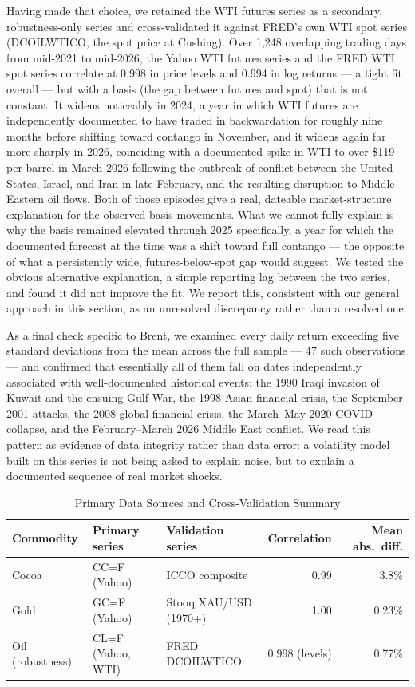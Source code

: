 \documentclass[preprint,12pt,authoryear]{elsarticle}
\begin{document}
Having made that choice, we retained the WTI futures series as a
secondary, robustness-only series and cross-validated it against
FRED's own WTI spot series (DCOILWTICO, the spot price at Cushing).
Over 1{,}248 overlapping trading days from mid-2021 to mid-2026, the
Yahoo WTI futures series and the FRED WTI spot series correlate at
0.998 in price levels and 0.994 in log returns — a tight fit overall
— but with a basis (the gap between futures and spot) that is not
constant. It widens noticeably in 2024, a year in which WTI futures
are independently documented to have traded in backwardation for
roughly nine months before shifting toward contango in November, and
it widens again far more sharply in 2026, coinciding with a documented
spike in WTI to over \$119 per barrel in March 2026 following the
outbreak of conflict between the United States, Israel, and Iran in
late February, and the resulting disruption to Middle Eastern oil
flows. Both of those episodes give a real, dateable market-structure
explanation for the observed basis movements. What we cannot fully
explain is why the basis remained elevated through 2025 specifically,
a year for which the documented forecast at the time was a shift
toward full contango — the opposite of what a persistently wide,
futures-below-spot gap would suggest. We tested the obvious
alternative explanation, a simple reporting lag between the two
series, and found it did not improve the fit. We report this,
consistent with our general approach in this section, as an
unresolved discrepancy rather than a resolved one.

As a final check specific to Brent, we examined every daily return
exceeding five standard deviations from the mean across the full
sample — 47 such observations — and confirmed that essentially all of
them fall on dates independently associated with well-documented
historical events: the 1990 Iraqi invasion of Kuwait and the ensuing
Gulf War, the 1998 Asian financial crisis, the September 2001 attacks,
the 2008 global financial crisis, the March–May 2020 COVID collapse,
and the February–March 2026 Middle East conflict. We read this
pattern as evidence of data integrity rather than data error: a
volatility model built on this series is not being asked to explain
noise, but to explain a documented sequence of real market shocks.

\begin{table}[htbp]
\centering
\caption{Primary Data Sources and Cross-Validation Summary}
\label{tab:sources}
\small
\begin{tabular}{lllrr}
\toprule
Commodity & Primary series & Validation series & Correlation & Mean abs.\ diff. \\
\midrule
Cocoa & CC=F (Yahoo) & ICCO composite & 0.99 & 3.8\% \\
Gold  & GC=F (Yahoo) & Stooq XAU/USD (1970+) & 1.00 & 0.23\% \\
Oil (robustness) & CL=F (Yahoo, WTI) & FRED DCOILWTICO & 0.998 (levels) & 0.77\% \\
\bottomrule
\end{tabular}
\end{table}
\end{document}
